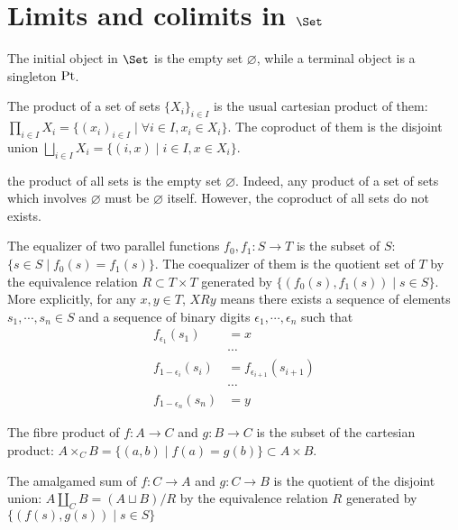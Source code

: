 \newpage\section{Limits and colimits in $\Set$}
\begin{prop}
  The initial object in $\Set$ is the empty set $\varnothing$, while a terminal object is a singleton $\operatorname{Pt}$.
\end{prop}
\begin{prop}
  The product of a set of sets $\{X_i\}_{i\in I}$ is the usual cartesian product of them: $\prod_{i\in I}X_i =\{(x_i)_{i\in I}\mid\forall i\in I, x_i\in X_i\}$.
  The coproduct of them is the disjoint union $\bigsqcup_{i\in I}X_i =\{(i,x)\mid i\in I, x\in X_i\}$.
\end{prop}
\begin{prop}
  the product of all sets is the empty set $\varnothing$. Indeed, any product of a set of sets  which involves $\varnothing$ must be $\varnothing$ itself. However, the coproduct of all sets do not exists.
\end{prop}
\begin{prop}
  The equalizer of two parallel functions $f_0,f_1\colon S\to T$ is the subset of $S$: $\{s\in S\mid f_0(s)=f_1(s)\}$.
  The coequalizer of them is the quotient set of $T$ by the equivalence relation $R\subset T\times T$ generated by $\{(f_0(s),f_1(s))\mid s\in S\}$. More explicitly, for any $x,y\in T$, $XRy$ means there exists a sequence of elements $s_1,\cdots,s_n\in S$ and a sequence of binary digits $\epsilon_1,\cdots,\epsilon_n$ such that
    \begin{align*}
      f_{\epsilon_1}(s_1) & = x\\
      &\cdots\\
      f_{1-\epsilon_i}(s_i) & = f_{\epsilon_{i+1}}(s_{i+1})\\
      &\cdots\\
      f_{1-\epsilon_n}(s_n) & = y
    \end{align*}
\end{prop}
\begin{prop}
  The fibre product of $f\colon A\to C$ and $g\colon B\to C$ is the subset of the cartesian product:
  $A\times_CB=\{(a,b)\mid f(a)=g(b)\}\subset A\times B$.
\end{prop}
\begin{prop}
  The amalgamed sum of $f\colon C\to A$ and $g\colon C\to B$ is the quotient of the disjoint union:
  $A\amalg_CB=(A\sqcup B)/R$ by the equivalence relation $R$ generated by $\{(f(s),g(s))\mid s\in S\}$
\end{prop}

